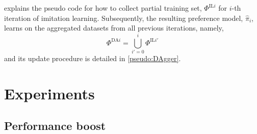 
 explains the pseudo code for how to collect 
partial training set, $\Phi^{\text{IL}i}$ for $i$-th iteration of imitation 
learning.
Subsequently, the resulting preference model, $\hat{\pi}_i$, learns on the 
aggregated datasets from all previous iterations, namely,  
\begin{equation}\label{eq:DAgger}
\Phi^{\text{DA}i}=\bigcup_{i'=0}^{i}\Phi^{\text{IL}i'}
\end{equation}
and its update procedure is detailed in \cref{pseudo:DAgger}.




\section{Experiments}\label{sec:expr}

\subsection*{Performance boost}

